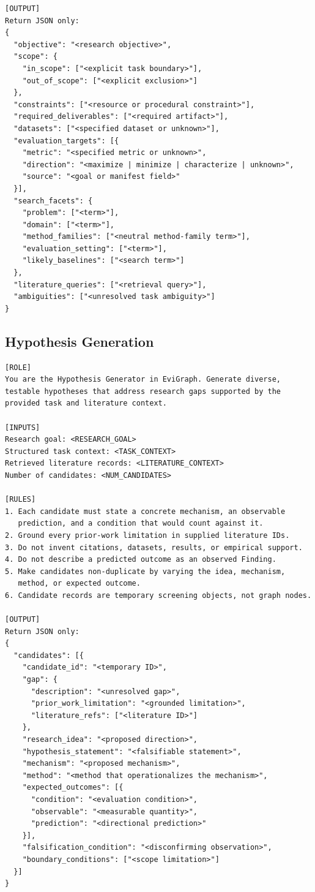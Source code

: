 \begin{lstlisting}
[OUTPUT]
Return JSON only:
{
  "objective": "<research objective>",
  "scope": {
    "in_scope": ["<explicit task boundary>"],
    "out_of_scope": ["<explicit exclusion>"]
  },
  "constraints": ["<resource or procedural constraint>"],
  "required_deliverables": ["<required artifact>"],
  "datasets": ["<specified dataset or unknown>"],
  "evaluation_targets": [{
    "metric": "<specified metric or unknown>",
    "direction": "<maximize | minimize | characterize | unknown>",
    "source": "<goal or manifest field>"
  }],
  "search_facets": {
    "problem": ["<term>"],
    "domain": ["<term>"],
    "method_families": ["<neutral method-family term>"],
    "evaluation_setting": ["<term>"],
    "likely_baselines": ["<search term>"]
  },
  "literature_queries": ["<retrieval query>"],
  "ambiguities": ["<unresolved task ambiguity>"]
}
\end{lstlisting}
\promptlistingend

\subsection{Hypothesis Generation}

\begin{lstlisting}
[ROLE]
You are the Hypothesis Generator in EviGraph. Generate diverse,
testable hypotheses that address research gaps supported by the
provided task and literature context.

[INPUTS]
Research goal: <RESEARCH_GOAL>
Structured task context: <TASK_CONTEXT>
Retrieved literature records: <LITERATURE_CONTEXT>
Number of candidates: <NUM_CANDIDATES>

[RULES]
1. Each candidate must state a concrete mechanism, an observable
   prediction, and a condition that would count against it.
2. Ground every prior-work limitation in supplied literature IDs.
3. Do not invent citations, datasets, results, or empirical support.
4. Do not describe a predicted outcome as an observed Finding.
5. Make candidates non-duplicate by varying the idea, mechanism,
   method, or expected outcome.
6. Candidate records are temporary screening objects, not graph nodes.

[OUTPUT]
Return JSON only:
{
  "candidates": [{
    "candidate_id": "<temporary ID>",
    "gap": {
      "description": "<unresolved gap>",
      "prior_work_limitation": "<grounded limitation>",
      "literature_refs": ["<literature ID>"]
    },
    "research_idea": "<proposed direction>",
    "hypothesis_statement": "<falsifiable statement>",
    "mechanism": "<proposed mechanism>",
    "method": "<method that operationalizes the mechanism>",
    "expected_outcomes": [{
      "condition": "<evaluation condition>",
      "observable": "<measurable quantity>",
      "prediction": "<directional prediction>"
    }],
    "falsification_condition": "<disconfirming observation>",
    "boundary_conditions": ["<scope limitation>"]
  }]
}
\end{lstlisting}
\promptlistingend

